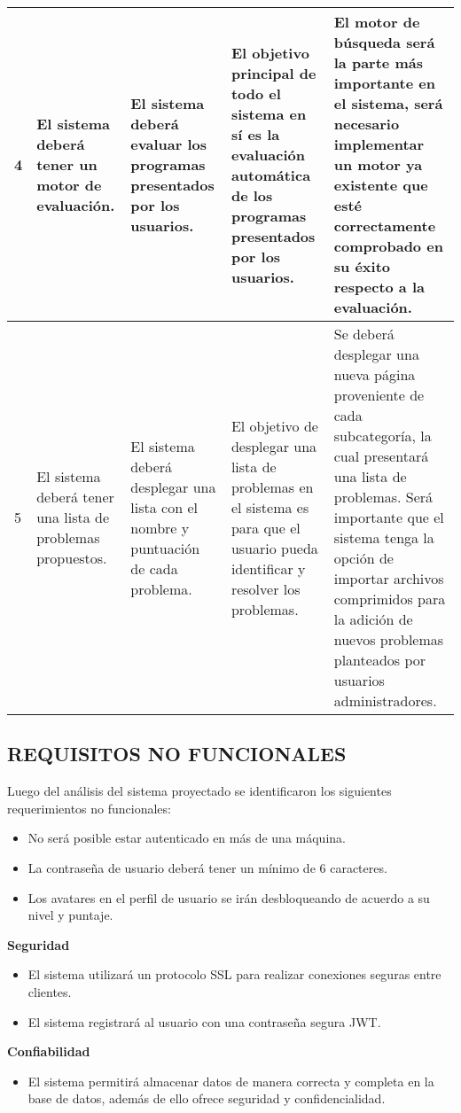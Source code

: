 \begin{longtable}[c]{| m{0.5cm} | m{3.5cm} | m{3.5cm} | m{3cm} | m{3.5cm} |}
            4
            & El sistema deberá tener
un motor de
evaluación.
            & El sistema deberá evaluar
los programas presentados por
los usuarios.
            & El objetivo principal de todo
el sistema en sí es la
evaluación automática de
los programas presentados
por los usuarios.
            & El motor de búsqueda será la
parte más importante en el sistema,
será necesario implementar un motor
ya existente que esté correctamente
comprobado en su éxito respecto a la
evaluación.
            \\ \hline
            5
            & El sistema deberá tener
una lista de problemas
propuestos.
            & El sistema deberá desplegar una
lista con el nombre y puntuación
de cada problema.
    & El objetivo de desplegar una
lista de problemas en el
sistema es para que el
usuario pueda identificar y
resolver los problemas.
    & Se deberá desplegar una nueva
página proveniente de cada subcategoría, la cual presentará una lista
de problemas.
Será importante que el sistema tenga
la opción de importar archivos
comprimidos para la adición de
nuevos problemas planteados por
usuarios administradores.
    \\ \hline
\end{longtable}

\subsection{REQUISITOS NO FUNCIONALES}

Luego del análisis del sistema proyectado se identificaron los siguientes requerimientos no
funcionales:
\begin{itemize}
    \item No será posible estar autenticado en más de una máquina.
    \item La contraseña de usuario deberá tener un mínimo de 6 caracteres.
    \item Los avatares en el perfil de usuario se irán desbloqueando de acuerdo a su nivel y puntaje. 
\end{itemize}

\textbf{Seguridad}
\begin{itemize}
    \item El sistema utilizará un protocolo SSL para realizar conexiones seguras entre clientes.
    \item El sistema registrará al usuario con una contraseña segura JWT.
\end{itemize}

\textbf{Confiabilidad}
\begin{itemize}
    \item El sistema permitirá almacenar datos de manera correcta y completa en la base de datos, además de ello ofrece seguridad y confidencialidad.
\end{itemize}

